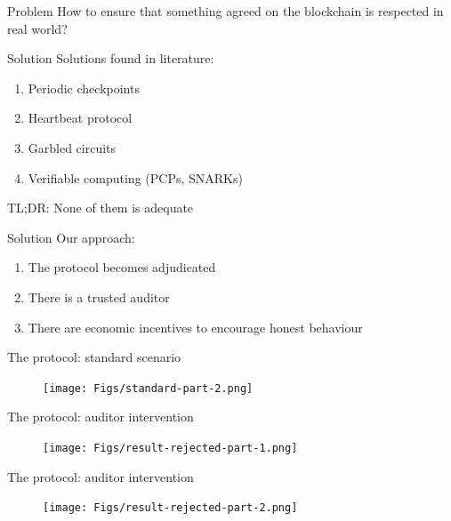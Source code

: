 \documentclass{beamer}
\begin{document}
    \begin{frame}{Problem}
        \centering
        How to ensure that something agreed on the blockchain is respected in real world?
    \end{frame}
    \begin{frame}{Solution}
        Solutions found in literature:
        \begin{enumerate}
            \item Periodic checkpoints
            \item Heartbeat protocol
            \item Garbled circuits
            \item Verifiable computing (PCPs, SNARKs)
        \end{enumerate}
        \centering
        TL;DR: None of them is adequate
    \end{frame}
    \begin{frame}{Solution}
        Our approach:
        \begin{enumerate}
            \item The protocol becomes adjudicated
            \item There is a trusted auditor
            \item There are economic incentives to encourage honest behaviour
        \end{enumerate}
    \end{frame}

    \begin{frame}{The protocol: standard scenario}
        \begin{figure}
            \begin{center}
                \texttt{[image: Figs/standard-part-2.png]}
            \end{center}
        \end{figure}
    \end{frame}
    \begin{frame}{The protocol: auditor intervention}
        \begin{figure}
            \begin{center}
                \texttt{[image: Figs/result-rejected-part-1.png]}
            \end{center}
        \end{figure}
    \end{frame}
    \begin{frame}{The protocol: auditor intervention}
        \begin{figure}
            \begin{center}
                \texttt{[image: Figs/result-rejected-part-2.png]}
            \end{center}
        \end{figure}
    \end{frame}
\end{document}
